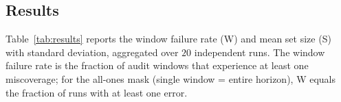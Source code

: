 \documentclass{uai2026} %
\newcommand{\1}{\mathbf{1}}
\begin{document}
\subsection{Results}
\label{sec:results}

Table~\ref{tab:results} reports the window failure rate (W) and mean set size (S) with standard deviation, aggregated over $20$ independent runs.
The window failure rate is the fraction of audit windows that experience at least one miscoverage; for the all-ones mask (single window = entire horizon), W equals the fraction of runs with at least one error.

\begin{table}[t]
  \centering
  \caption{%
    Results on California Housing (regression) and CIFAR-10 (classification) under no-drift (ND) and drift (D) conditions.
    \textbf{W}: window failure rate (fraction of windows with at least one miscoverage).
    \textbf{S}: mean prediction set size (interval width for regression; set cardinality for classification); $\pm$ denotes standard deviation across runs.
  }
  \label{tab:results}
    

\end{table}
\end{document}
